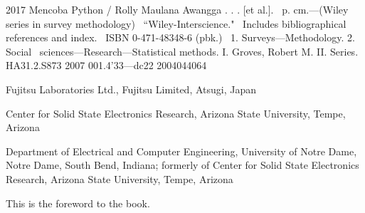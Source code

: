 \documentclass{wileySix}
\begin{document}
\subtitle{Belajar Python untuk Pemula}




\halftitlepage

\titlepage


\begin{copyrightpage}{2017}
Mencoba Python / Rolly Maulana Awangga . . . [et al.].
\       p. cm.---(Wiley series in survey methodology)
\    ``Wiley-Interscience."
\    Includes bibliographical references and index.
\    ISBN 0-471-48348-6 (pbk.)
\    1. Surveys---Methodology.  2. Social 
\  sciences---Research---Statistical methods.  I. Groves, Robert M.  II. %
Series.\\

HA31.2.S873 2007
001.4'33---dc22                                             2004044064
\end{copyrightpage}

\dedication{Untuk Nusa Bangsa dan Agama}

\begin{contributors}
 Fujitsu Laboratories Ltd., Fujitsu Limited, Atsugi,
Japan

 Center for Solid State Electronics Research, Arizona
State University, Tempe, Arizona

 Department of Electrical and
Computer Engineering, University of Notre Dame, Notre Dame, South Bend, 
Indiana; formerly of
Center for Solid State Electronics Research, Arizona
State University, Tempe, Arizona 
\end{contributors}

\contentsinbrief
\tableofcontents
\listoffigures
\listoftables


\begin{foreword}
This is the foreword to the book.
\end{foreword}
\end{document}
